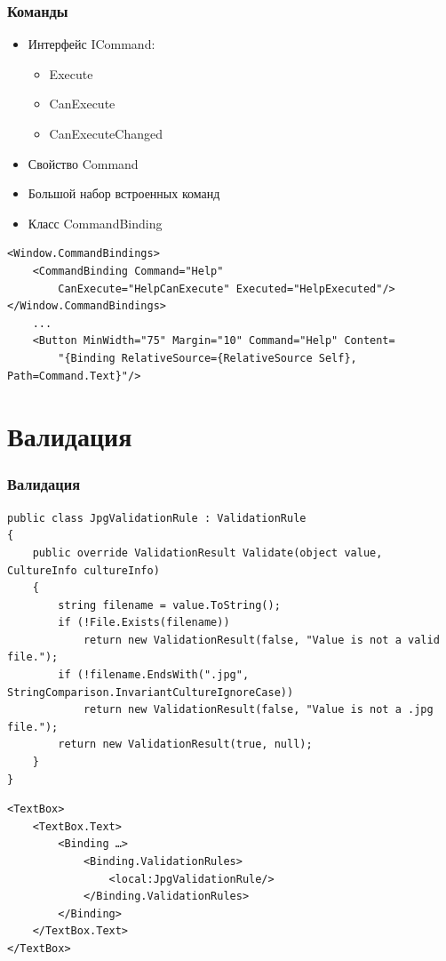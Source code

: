 \documentclass[xetex,mathserif,serif]{beamer}
\begin{document}
	\begin{frame}[fragile]
		\frametitle{Команды}
		\begin{itemize}
			\item Интерфейс ICommand:
			\begin{itemize}
				\item Execute
				\item CanExecute
				\item CanExecuteChanged
			\end{itemize}
			\item Свойство Command
			\item Большой набор встроенных команд
			\item Класс CommandBinding
		\end{itemize}
		\begin{small}
			\begin{verbatim}
<Window.CommandBindings>
    <CommandBinding Command="Help"
        CanExecute="HelpCanExecute" Executed="HelpExecuted"/>
</Window.CommandBindings>
    ...
    <Button MinWidth="75" Margin="10" Command="Help" Content=
        "{Binding RelativeSource={RelativeSource Self}, Path=Command.Text}"/>
			\end{verbatim}
		\end{small}
	\end{frame}

	\section{Валидация}

	\begin{frame}[fragile]
		\frametitle{Валидация}
		\begin{scriptsize}
			\begin{verbatim}
public class JpgValidationRule : ValidationRule
{
    public override ValidationResult Validate(object value, CultureInfo cultureInfo)
    {
        string filename = value.ToString();
        if (!File.Exists(filename))
            return new ValidationResult(false, "Value is not a valid file.");
        if (!filename.EndsWith(".jpg", StringComparison.InvariantCultureIgnoreCase))
            return new ValidationResult(false, "Value is not a .jpg file.");
        return new ValidationResult(true, null);
    }
}			\end{verbatim}
			\vspace{3mm}
			\begin{verbatim}
<TextBox>
    <TextBox.Text>
        <Binding …>
            <Binding.ValidationRules>
                <local:JpgValidationRule/>
            </Binding.ValidationRules>
        </Binding>
    </TextBox.Text>
</TextBox>
			\end{verbatim}
		\end{scriptsize}
	\end{frame}
\end{document}
